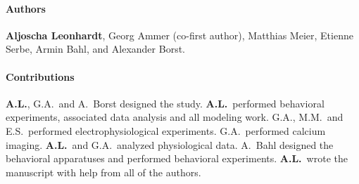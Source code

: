 \paragraph{Authors} \textbf{Aljoscha Leonhardt}, Georg Ammer (co-first author), Matthias Meier, Etienne Serbe, Armin Bahl, and Alexander Borst.

\paragraph{Contributions}
\textbf{A.L.}, G.A.\ and A.\ Borst designed the study. \textbf{A.L.}\ performed behavioral experiments, associated data analysis and all modeling work. G.A., M.M.\ and E.S.\ performed electrophysiological experiments. G.A.\ performed calcium imaging. \textbf{A.L.}\ and G.A.\ analyzed physiological data. A.\ Bahl designed the behavioral apparatuses and performed behavioral experiments. \textbf{A.L.}\ wrote the manuscript with help from all of the authors.

\cleardoublepage


